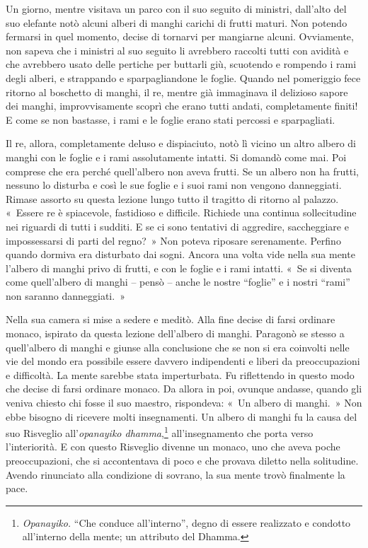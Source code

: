 Un giorno, mentre visitava un parco con il suo seguito di ministri,
dall'alto del suo elefante notò alcuni alberi di manghi carichi di
frutti maturi. Non potendo fermarsi in quel momento, decise di tornarvi
per mangiarne alcuni. Ovviamente, non sapeva che i ministri al suo
seguito li avrebbero raccolti tutti con avidità e che avrebbero usato
delle pertiche per buttarli giù, scuotendo e rompendo i rami degli
alberi, e strappando e sparpagliandone le foglie. Quando nel pomeriggio
fece ritorno al boschetto di manghi, il re, mentre già immaginava il
delizioso sapore dei manghi, improvvisamente scoprì che erano tutti
andati, completamente finiti! E come se non bastasse, i rami e le foglie
erano stati percossi e sparpagliati.

Il re, allora, completamente deluso e dispiaciuto, notò lì vicino un
altro albero di manghi con le foglie e i rami assolutamente intatti. Si
domandò come mai. Poi comprese che era perché quell'albero non aveva
frutti. Se un albero non ha frutti, nessuno lo disturba e così le sue
foglie e i suoi rami non vengono danneggiati. Rimase assorto su questa
lezione lungo tutto il tragitto di ritorno al palazzo. «~Essere re è
spiacevole, fastidioso e difficile. Richiede una continua sollecitudine
nei riguardi di tutti i sudditi. E se ci sono tentativi di aggredire,
saccheggiare e impossessarsi di parti del regno?~» Non poteva riposare
serenamente. Perfino quando dormiva era disturbato dai sogni. Ancora una
volta vide nella sua mente l'albero di manghi privo di frutti, e con le
foglie e i rami intatti. «~Se si diventa come quell'albero di manghi --
pensò -- anche le nostre ``foglie'' e i nostri ``rami'' non saranno
danneggiati.~»

Nella sua camera si mise a sedere e meditò. Alla fine decise di farsi
ordinare monaco, ispirato da questa lezione dell'albero di manghi.
Paragonò se stesso a quell'albero di manghi e giunse alla conclusione
che se non si era coinvolti nelle vie del mondo era possibile essere
davvero indipendenti e liberi da preoccupazioni e difficoltà. La mente
sarebbe stata imperturbata. Fu riflettendo in questo modo che decise di
farsi ordinare monaco. Da allora in poi, ovunque andasse, quando gli
veniva chiesto chi fosse il suo maestro, rispondeva: «~Un albero di
manghi.~» Non ebbe bisogno di ricevere molti insegnamenti. Un albero di
manghi fu la causa del suo Risveglio all'\emph{opanayiko
dhamma},\footnote{\emph{Opanayiko.} ``Che conduce all'interno'', degno
  di essere realizzato e condotto all'interno della mente; un attributo
  del Dhamma.} all'insegnamento che porta verso l'interiorità. E con
questo Risveglio divenne un monaco, uno che aveva poche preoccupazioni,
che si accontentava di poco e che provava diletto nella solitudine.
Avendo rinunciato alla condizione di sovrano, la sua mente trovò
finalmente la pace.

